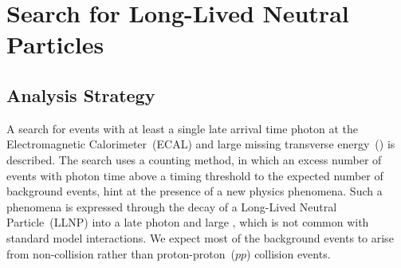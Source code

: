 \chapter{Search for Long-Lived Neutral Particles }
\section{Analysis Strategy}\label{Analysis}
A search for events with at least a single late arrival time photon at the Electromagnetic Calorimeter~(ECAL) and  large missing transverse energy~(\MET) is described. The search uses a counting method, in which an excess number of events with photon time above a timing threshold to the expected number of background events, hint at the presence of a new physics phenomena. Such a phenomena is expressed through the decay of a Long-Lived Neutral Particle~(LLNP) into a late photon and large \MET, which is not common with standard model interactions. We expect most of the background events to arise from  non-collision rather than proton-proton~($pp$) collision events.
